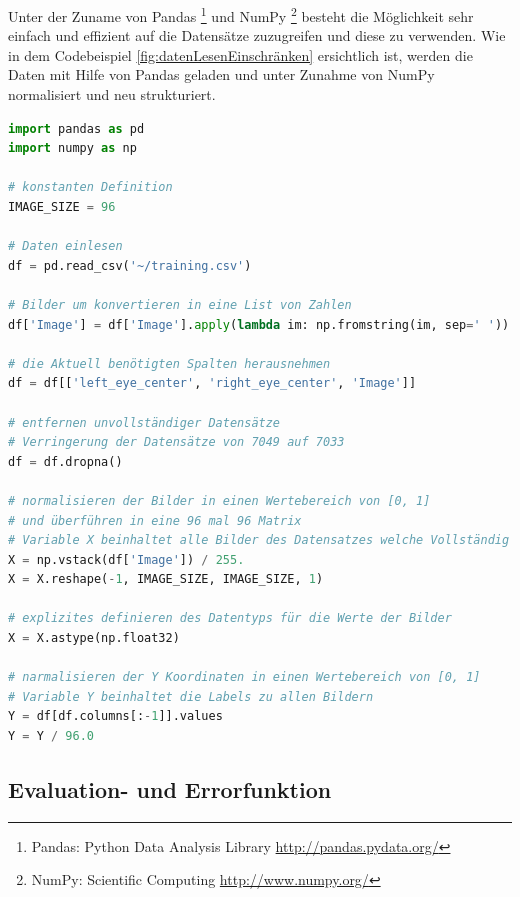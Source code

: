\noindent
Unter der Zuname von Pandas \footnote{Pandas: Python Data Analysis Library \url{http://pandas.pydata.org/}} und NumPy \footnote{NumPy: Scientific Computing \url{http://www.numpy.org/}} besteht die Möglichkeit sehr einfach und effizient auf die Datensätze zuzugreifen und diese zu verwenden. 
Wie in dem Codebeispiel \ref{fig:datenLesenEinschränken} ersichtlich ist, werden die Daten mit Hilfe von Pandas geladen und unter Zunahme von NumPy normalisiert und neu strukturiert. 
\begin{lstlisting}[caption={Daten einlesen und einschränken},label=fig:datenLesenEinschränken,captionpos=b,language=Python]
import pandas as pd
import numpy as np

# konstanten Definition
IMAGE_SIZE = 96

# Daten einlesen
df = pd.read_csv('~/training.csv')

# Bilder um konvertieren in eine List von Zahlen
df['Image'] = df['Image'].apply(lambda im: np.fromstring(im, sep=' '))

# die Aktuell benötigten Spalten herausnehmen
df = df[['left_eye_center', 'right_eye_center', 'Image']]

# entfernen unvollständiger Datensätze
# Verringerung der Datensätze von 7049 auf 7033
df = df.dropna()

# normalisieren der Bilder in einen Wertebereich von [0, 1] 
# und überführen in eine 96 mal 96 Matrix
# Variable X beinhaltet alle Bilder des Datensatzes welche Vollständig sind
X = np.vstack(df['Image']) / 255.
X = X.reshape(-1, IMAGE_SIZE, IMAGE_SIZE, 1)

# explizites definieren des Datentyps für die Werte der Bilder
X = X.astype(np.float32)

# narmalisieren der Y Koordinaten in einen Wertebereich von [0, 1]
# Variable Y beinhaltet die Labels zu allen Bildern
Y = df[df.columns[:-1]].values
Y = Y / 96.0
\end{lstlisting}

\subsection{Evaluation- und Errorfunktion}


